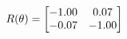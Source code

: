 \documentclass[preview]{standalone}
\begin{document}
\begin{align*}
\special{dvisvgm:raw <g id='unique000'>}R(\theta) = \begin{bmatrix}-1.00 & 0.07\\-0.07 & -1.00\end{bmatrix}\special{dvisvgm:raw </g>}
\end{align*}
\end{document}
